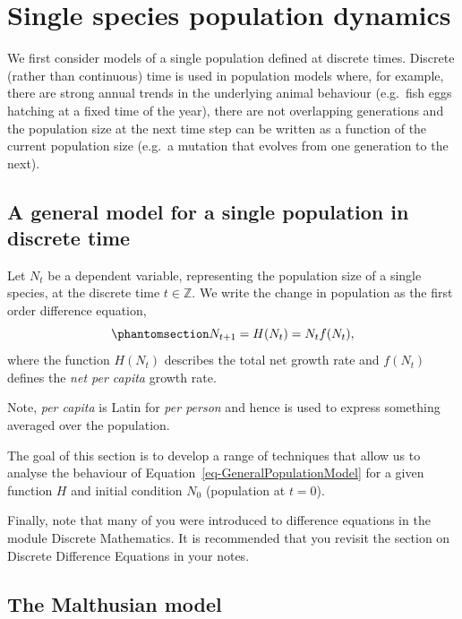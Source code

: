 \documentclass[
  letterpaper,
  DIV=11,
  numbers=noendperiod]{scrreprt}
\begin{document}
\chapter{Single species population
dynamics}\label{single-species-population-dynamics}

We first consider models of a single population defined at discrete
times. Discrete (rather than continuous) time is used in population
models where, for example, there are strong annual trends in the
underlying animal behaviour (e.g.~fish eggs hatching at a fixed time of
the year), there are not overlapping generations and the population size
at the next time step can be written as a function of the current
population size (e.g.~a mutation that evolves from one generation to the
next).

\section{A general model for a single population in discrete
time}\label{a-general-model-for-a-single-population-in-discrete-time}

Let \(N_t\) be a dependent variable, representing the population size of
a single species, at the discrete time \(t\in\mathbb{Z}\). We write the
change in population as the first order difference equation,
\begin{equation}\protect\phantomsection\label{eq-GeneralPopulationModel}{
N_{t+1} = H(N_t) = N_tf(N_t),
}\end{equation} where the function \(H(N_t)\) describes the total net
growth rate and \(f(N_t)\) defines the \emph{net per capita} growth
rate.

Note, \emph{per capita} is Latin for \emph{per person} and hence is used
to express something averaged over the population.

The goal of this section is to develop a range of techniques that allow
us to analyse the behaviour of Equation~\ref{eq-GeneralPopulationModel}
for a given function \(H\) and initial condition \(N_0\) (population at
\(t=0\)).

Finally, note that many of you were introduced to difference equations
in the module Discrete Mathematics. It is recommended that you revisit
the section on Discrete Difference Equations in your notes.

\section{The Malthusian model}\label{the-malthusian-model}
\end{document}
